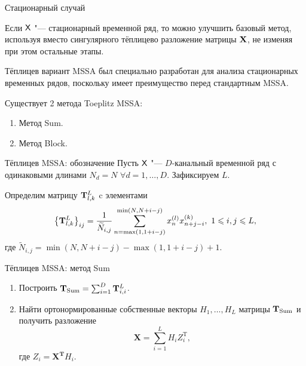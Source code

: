 \documentclass[ucs, notheorems, handout]{beamer}
\begin{document}
\begin{frame}{Стационарный случай}

	
	Если $\mathsf{X}$ "--- стационарный временной ряд, то можно улучшить базовый метод, используя вместо сингулярного тёплицево разложение матрицы $\mathbf{X}$, не изменяя при этом остальные этапы.\medskip
	
	Тёплицев вариант MSSA был специально разработан для анализа стационарных временных рядов, поскольку имеет преимущество перед стандартным MSSA. \medskip
	
	Существует 2 метода Toeplitz MSSA:\medskip
	\begin{enumerate}
		\item Метод Sum.\medskip
		\item Метод Block.\medskip
	\end{enumerate}
	
\end{frame}
\begin{frame}{Тёплицев MSSA: обозначение}
	Пусть $\mathsf{X}$ "--- $D$-канальный временной ряд с одинаковыми длинами $N_d=N$ $\forall d=1,\ldots,D$. Зафиксируем $L$.\medskip
	
	Определим матрицу $\mathbf{T}_{l,k}^{L}$ c элементами
	\begin{equation*}\label{eq:block_elements}
	\left\{\mathbf{T}^L_{l,k}\right\}_{ij}=\frac{1}{\widetilde N_{i,j}}\sum_{n=\max(1,1+i-j)}^{\min(N,N+i-j)} x^{(l)}_nx^{(k)}_{n+j-i},\ 1\leqslant i,j\leqslant L,
	\end{equation*}
	где $\widetilde N_{i,j}=\min(N,N+i-j)-\max(1,1+i-j)+1$.
\end{frame}
\begin{frame}{Тёплицев MSSA: метод Sum}
	\begin{enumerate}
		\item Построить $\mathbf{T}_{\text{Sum}}=\sum_{i=1}^D \mathbf{T}^{L}_{i,i}$.\medskip
		\item Найти ортонормированные собственные векторы $H_1,\ldots,H_L$ матрицы $\mathbf{T}_{\text{Sum}}$ и получить разложение
		\begin{equation*}
			\mathbf{X}=\sum_{i=1}^L H_i Z_i^\mathrm{T},
		\end{equation*}
		где $Z_i=\mathbf{X^T}H_i$.
	\end{enumerate}
\end{frame}
\end{document}

